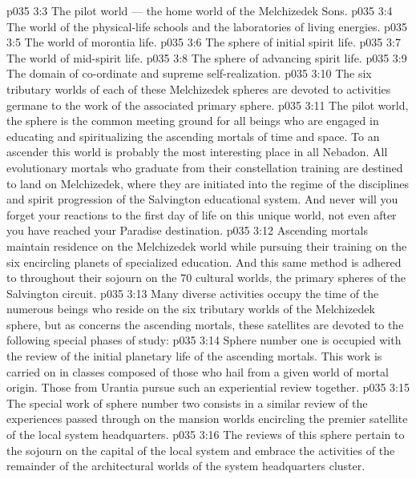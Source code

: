\vs p035 3:3 \bibnobreakspace The pilot world --- the home world of the Melchizedek Sons.
\vs p035 3:4 \bibnobreakspace The world of the physical\hyp{}life schools and the laboratories of living energies.
\vs p035 3:5 \bibnobreakspace The world of morontia life.
\vs p035 3:6 \bibnobreakspace The sphere of initial spirit life.
\vs p035 3:7 \bibnobreakspace The world of mid\hyp{}spirit life.
\vs p035 3:8 \bibnobreakspace The sphere of advancing spirit life.
\vs p035 3:9 \bibnobreakspace The domain of co\hyp{}ordinate and supreme self\hyp{}realization.
\vs p035 3:10 \pc The six tributary worlds of each of these Melchizedek spheres are devoted to activities germane to the work of the associated primary sphere.
\vs p035 3:11 \pc The pilot world, the sphere  is the common meeting ground for all beings who are engaged in educating and spiritualizing the ascending mortals of time and space. To an ascender this world is probably the most interesting place in all Nebadon. All evolutionary mortals who graduate from their constellation training are destined to land on Melchizedek, where they are initiated into the regime of the disciplines and spirit progression of the Salvington educational system. And never will you forget your reactions to the first day of life on this unique world, not even after you have reached your Paradise destination.
\vs p035 3:12 Ascending mortals maintain residence on the Melchizedek world while pursuing their training on the six encircling planets of specialized education. And this same method is adhered to throughout their sojourn on the 70 cultural worlds, the primary spheres of the Salvington circuit.
\vs p035 3:13 \pc Many diverse activities occupy the time of the numerous beings who reside on the six tributary worlds of the Melchizedek sphere, but as concerns the ascending mortals, these satellites are devoted to the following special phases of study:
\vs p035 3:14 \bibnobreakspace Sphere number one is occupied with the review of the initial planetary life of the ascending mortals. This work is carried on in classes composed of those who hail from a given world of mortal origin. Those from Urantia pursue such an experiential review together.
\vs p035 3:15 \bibnobreakspace The special work of sphere number two consists in a similar review of the experiences passed through on the mansion worlds encircling the premier satellite of the local system headquarters.
\vs p035 3:16 \bibnobreakspace The reviews of this sphere pertain to the sojourn on the capital of the local system and embrace the activities of the remainder of the architectural worlds of the system headquarters cluster.
